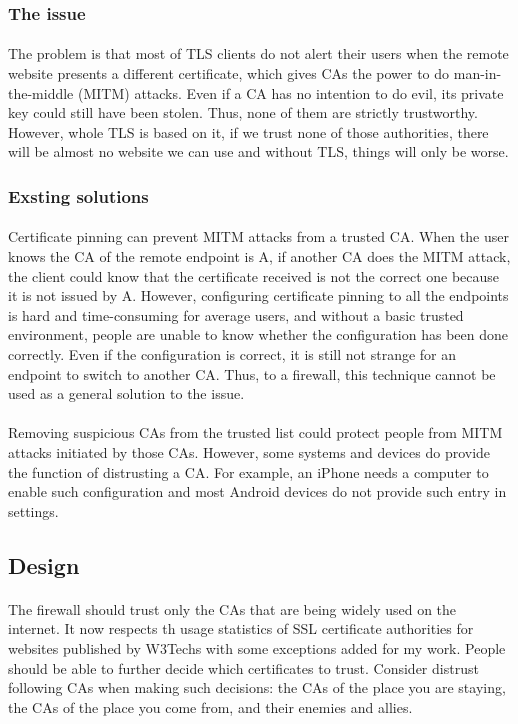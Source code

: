 \documentclass[mscthesis]{usiinfthesis}
\begin{document}
\subsubsection{The issue}
\paragraph{}
The problem is that most of TLS clients do not alert their users when the remote website presents a different certificate, which gives CAs the power to do man-in-the-middle (MITM) attacks. Even if a CA has no intention to do evil, its private key could still have been stolen. Thus, none of them are strictly trustworthy. However, whole TLS is based on it, if we trust none of those authorities, there will be almost no website we can use and without TLS, things will only be worse.
\subsubsection{Exsting solutions}
\paragraph{}
Certificate pinning can prevent MITM attacks from a trusted CA. When the user knows the CA of the remote endpoint is A, if another CA does the MITM attack, the client could know that the certificate received is not the correct one because it is not issued by A. However, configuring certificate pinning to all the endpoints is hard and time-consuming for average users, and without a basic trusted environment, people are unable to know whether the configuration has been done correctly. Even if the configuration is correct, it is still not strange for an endpoint to switch to another CA. Thus, to a firewall, this technique cannot be used as a general solution to the issue.
\paragraph{}
Removing suspicious CAs from the trusted list could protect people from MITM attacks initiated by those CAs. However, some systems and devices do provide the function of distrusting a CA. For example, an iPhone needs a computer to enable such configuration and most Android devices do not provide such entry in settings.
\subsection{Design}
\paragraph{}
The firewall should trust only the CAs that are being widely used on the internet. It now respects th usage statistics of SSL certificate authorities for websites published by W3Techs \citep{cert:stat} with some exceptions added for my work. People should be able to further decide which certificates to trust. Consider distrust following CAs when making such decisions: the CAs of the place you are staying, the CAs of the place you come from, and their enemies and allies.
\end{document}

